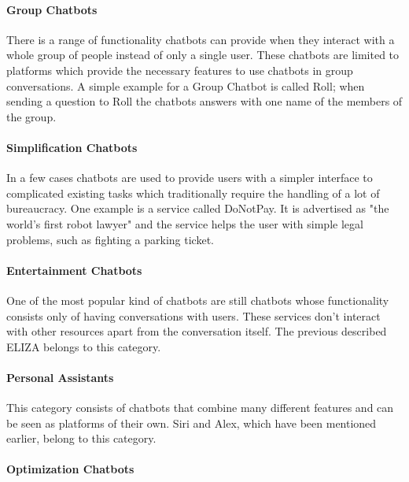 \paragraph{Group Chatbots}

There is a range of functionality chatbots can provide when they interact with a whole group of people instead of only a single user. These chatbots are limited to platforms which provide the necessary features to use chatbots in group conversations. A simple example for a Group Chatbot is called Roll\cite{venturebeat}; when sending a question to Roll the chatbots answers with one name of the members of the group.


\paragraph{Simplification Chatbots}

In a few cases chatbots are used to provide users with a simpler interface to complicated existing tasks which traditionally require the handling of a lot of bureaucracy. One example is a service called DoNotPay. It is advertised as "the world's first robot lawyer"\cite{oreilly} and the service helps the user with simple legal problems, such as fighting a parking ticket.


\paragraph{Entertainment Chatbots}

One of the most popular kind of chatbots are still chatbots whose functionality consists only of having conversations with users. These services don't interact with other resources apart from the conversation itself. The previous described ELIZA belongs to this category.


\paragraph{Personal Assistants}
\label{assistants}

This category consists of chatbots that combine many different features and can be seen as platforms of their own. Siri and Alex, which have been mentioned earlier, belong to this category.


\paragraph{Optimization Chatbots}

